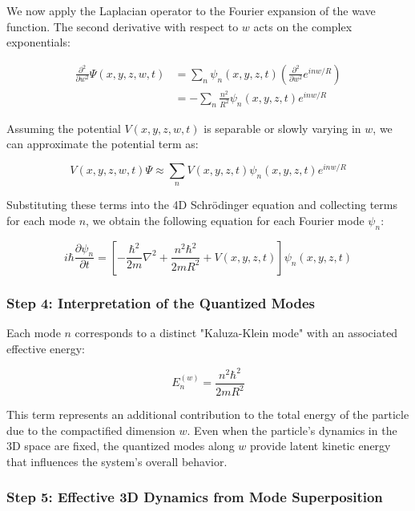 \documentclass[12pt]{article}
\begin{document}
We now apply the Laplacian operator to the Fourier expansion of the wave function. The second derivative with respect to \( w \) acts on the complex exponentials:

\begin{align}
\frac{\partial^2}{\partial w^2} \Psi(x, y, z, w, t) &= \sum_n \psi_n(x, y, z, t) \left( \frac{\partial^2}{\partial w^2} e^{i n w / R} \right) \\
&= -\sum_n \frac{n^2}{R^2} \psi_n(x, y, z, t) e^{i n w / R}
\end{align}

Assuming the potential \( V(x, y, z, w, t) \) is separable or slowly varying in \( w \), we can approximate the potential term as:

\begin{equation}
V(x, y, z, w, t) \Psi \approx \sum_n V(x, y, z, t) \psi_n(x, y, z, t) e^{i n w / R}
\end{equation}

Substituting these terms into the 4D Schrödinger equation and collecting terms for each mode \( n \), we obtain the following equation for each Fourier mode \( \psi_n \):

\begin{equation}
i\hbar \frac{\partial \psi_n}{\partial t} = \left[ -\frac{\hbar^2}{2m} \nabla^2 + \frac{n^2 \hbar^2}{2m R^2} + V(x, y, z, t) \right] \psi_n(x, y, z, t)
\end{equation}

\subsubsection*{Step 4: Interpretation of the Quantized Modes}

Each mode \( n \) corresponds to a distinct "Kaluza-Klein mode" with an associated effective energy:

\begin{equation}
E_n^{(w)} = \frac{n^2 \hbar^2}{2m R^2}
\end{equation}

This term represents an additional contribution to the total energy of the particle due to the compactified dimension \( w \). Even when the particle’s dynamics in the 3D space are fixed, the quantized modes along \( w \) provide latent kinetic energy that influences the system’s overall behavior.

\subsubsection*{Step 5: Effective 3D Dynamics from Mode Superposition}
\end{document}
